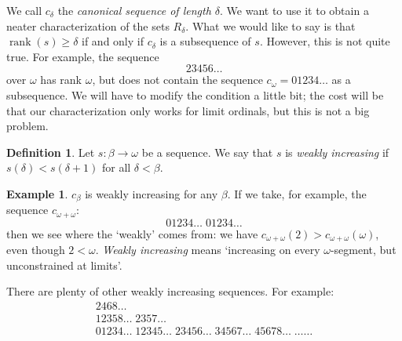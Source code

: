 \documentclass[11pt]{article} %
\theoremstyle{plain} %
\theoremstyle{definition} %
\newtheorem{definition}[theorem]{Definition}
\newtheorem{example}[theorem]{Example}
\theoremstyle{note}
\theoremstyle{exercisestyle}
\newcommand*\from{\colon}
\DeclareMathOperator{\rank}{rank}
\begin{document}
We call $c_\delta$ the \emph{canonical sequence of length $\delta$}.  We want to use it to obtain a neater characterization of the sets $R_\delta$.  What we would like to say is that $\rank(s)\ge\delta$ if and only if $c_\delta$ is a subsequence of $s$.  However, this is not quite true.  For example, the sequence
\[
  23456\dots
  \]
over $\omega$ has rank $\omega$, but does not contain the sequence $c_\omega=01234\dots$ as a subsequence.  We will have to modify the condition a little bit; the cost will be that our characterization only works for limit ordinals, but this is not a big problem.  

\begin{definition}
  Let $s\from\beta\to\omega$ be a sequence.  We say that $s$ is \emph{weakly increasing} if $s(\delta)<s(\delta+1)$ for all $\delta<\beta$.
\end{definition}

\begin{example}
  $c_\beta$ is weakly increasing for any $\beta$.  If we take, for example, the sequence $c_{\omega+\omega}$:
  \[
    01234\dots\;01234\dots
    \]
  then we see where the `weakly' comes from: we have $c_{\omega+\omega}(2)>c_{\omega+\omega}(\omega)$, even though $2<\omega$.  \emph{Weakly increasing} means `increasing on every $\omega$-segment, but unconstrained at limits'.  

  There are plenty of other weakly increasing sequences.  For example:
  \begin{gather*}
    2468\dots \\
    12358\dots\;2357\dots \\
    01234\dots\;12345\dots\;23456\dots\;34567\dots\;45678\dots\;\dots\dots
  \end{gather*}
\end{example}

\pagebreak
\end{document}
